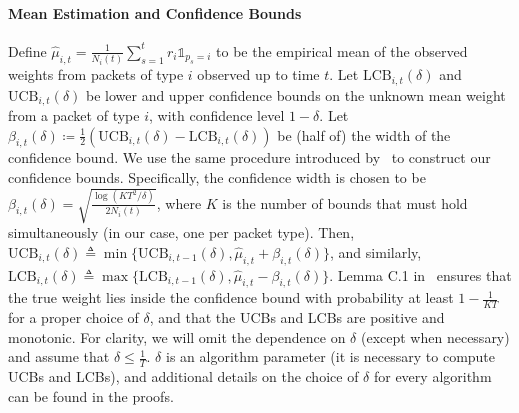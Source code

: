 \paragraph{Mean Estimation and Confidence Bounds}
Define $\widehat{\mu}_{i,t} = \frac{1}{N_i(t)} \sum_{s=1}^t r_i \mathds{1}_{p_s = i}$ to be the empirical mean of the observed weights from packets of type $i$ observed up to time $t$. Let $\mathrm{LCB}_{i,t}(\delta)$ and $\mathrm{UCB}_{i,t}(\delta)$ be lower and upper confidence bounds on the unknown mean weight from a packet of type $i$, with confidence level $1-\delta$.  Let $\beta_{i,t}(\delta) \coloneqq \frac{1}{2}(\mathrm{UCB}_{i,t}(\delta) - \mathrm{LCB}_{i,t}(\delta))$ be (half of) the width of the confidence bound. We use the same procedure introduced by~\cite{levy2024online} to construct our confidence bounds. Specifically, the confidence width is chosen to be $\beta_{i,t}(\delta) = \sqrt{\frac{\log(K T^2/\delta)}{2 N_i(t)}}$, where $K$ is the number of bounds that must hold simultaneously (in our case, one per packet type). Then, $\mathrm{UCB}_{i,t}(\delta) \triangleq \min\{ \mathrm{UCB}_{i,t - 1}(\delta), \widehat{\mu}_{i,t} +\beta_{i,t}(\delta) \}$, and similarly, $\mathrm{LCB}_{i,t}(\delta) \triangleq \max\{ \mathrm{LCB}_{i,t - 1}(\delta), \widehat{\mu}_{i,t} - \beta_{i,t}(\delta) \}$. Lemma C.1 in~\cite{levy2024online} ensures that the true weight lies inside the confidence bound with probability at least $1 - \frac{1}{KT}$ for a proper choice of $\delta$, and that the UCBs and LCBs are positive and monotonic. For clarity, we will omit the dependence on $\delta$ (except when necessary) and assume that $\delta \le \frac{1}{T}$. $\delta$ is an algorithm parameter (it is necessary to compute UCBs and LCBs), and additional details on the choice of $\delta$ for every algorithm can be found in the proofs.


